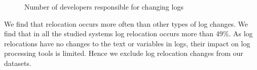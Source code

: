\begin{figure}[tb]

\centering
  \hfill
\caption{Number of developers responsible for changing logs}
\label{fig:NumberofDevelopers}
\end{figure}
We find that relocation occurs more often than other types of log changes. We find that in all the studied systems log relocation occurs more than 49\%. As log relocations have no changes to the text or variables in logs, their impact on log processing tools is limited. Hence we exclude log relocation changes from our datasets. 


